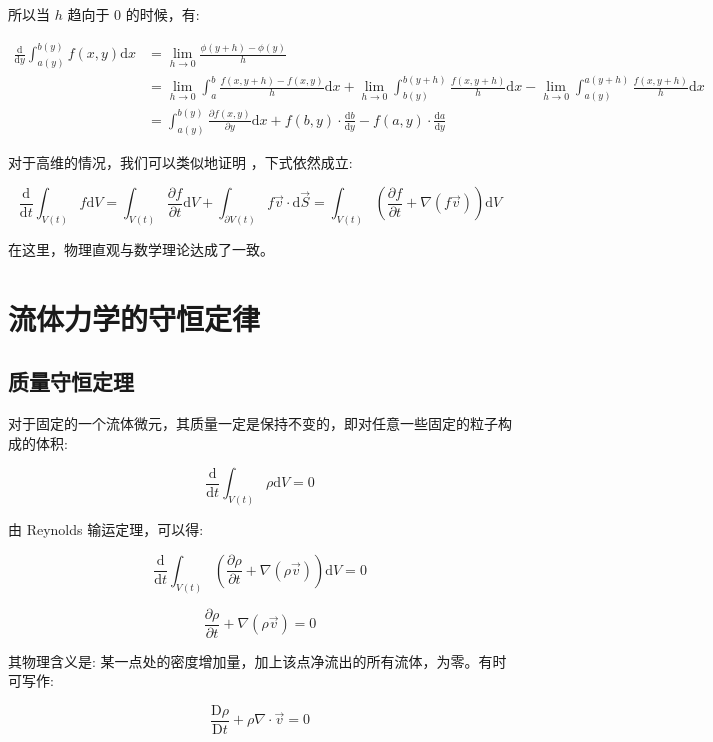 \documentclass[fontset=windows]{article}
\newcommand{\upcite}[1]{\textsuperscript{\cite{#1}}}
\begin{document}
所以当 $h$ 趋向于 $0$ 的时候，有:

$$
\begin{aligned}
\frac{\mathrm{d}}{\mathrm{d}y} \int_{a(y)}^{b(y)}f(x,y) \mathrm{d}x 
    &= \lim_{h \rightarrow 0} \frac{\phi(y + h) - \phi(y)}{h} \\
    &= \lim_{h \rightarrow 0} \int_{a}^{b}\frac{f(x,y + h) - f(x,y)}{h}\mathrm{d}x +
       \lim_{h \rightarrow 0} \int_{b(y)}^{b(y + h)} \frac{f(x,y + h)}{h}\mathrm{d}x -
       \lim_{h \rightarrow 0} \int_{a(y)}^{a(y + h)} \frac{f(x,y + h)}{h}\mathrm{d}x \\
    &= \int_{a(y)}^{b(y)}\frac{\partial f(x,y)}{\partial y} \mathrm{d}x
+ f(b,y) \cdot \frac{\mathrm{d}b}{\mathrm{d}y}
- f(a,y) \cdot \frac{\mathrm{d}a}{\mathrm{d}y}
\end{aligned}
$$

对于高维的情况，我们可以类似地证明 \upcite{ref2} ，下式依然成立:

$$
\frac{\mathrm{d}}{\mathrm{d}t} \int_{V(t)} f \mathrm{d}V
= \int_{V(t)} \frac{\partial f}{\partial t} \mathrm{d}V +
  \int_{\partial V(t)} {f \vec{v} \cdot \mathrm{d}\vec{S}}
= \int_{V(t)} (\frac{\partial f}{\partial t} + \nabla (f \vec{v})) \mathrm{d}V
$$

在这里，物理直观与数学理论达成了一致。

\section{流体力学的守恒定律}

\subsection{质量守恒定理}

对于固定的一个流体微元，其质量一定是保持不变的，即对任意一些固定的粒子构成的体积:

$$
\frac{\mathrm{d}}{\mathrm{d}t} \int_{V(t)} \rho \mathrm{d}V = 0
$$

由 Reynolds 输运定理，可以得:

$$
\frac{\mathrm{d}}{\mathrm{d}t} \int_{V(t)} 
    (\frac{\partial \rho}{\partial t} + \nabla (\rho \vec{v})) \mathrm{d}V = 0
$$

$$
\frac{\partial \rho}{\partial t} + \nabla (\rho \vec{v}) = 0
$$

其物理含义是: 某一点处的密度增加量，加上该点净流出的所有流体，为零。有时可写作:

$$
\frac{\mathrm{D} \rho}{\mathrm{D} t} + \rho \nabla \cdot \vec{v} = 0
$$
\end{document}
